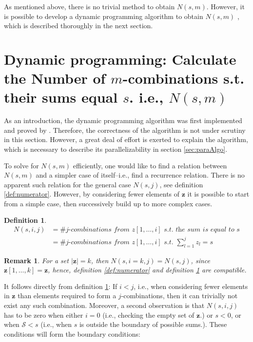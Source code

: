 \documentclass[a4paper,11pt]{article}
\newtheorem{mydef}{Definition}
\newtheorem{myremark}{Remark}
\begin{document}
As mentioned above, there is no trivial method to obtain $N(s,m)$. However, it is possible to develop a  dynamic programming algorithm to obtain $N(s,m)$ \cite{pagano_trichtler1983, zimmermann1985}, which is described thoroughly in the next section.

\section{Dynamic programming: Calculate the Number of $m$-combinations s.t. their sums equal $s$. i.e., $N(s,m)$}
\label{sec:calcBottleneck}

As an introduction, the dynamic programming algorithm was first implemented and proved by \cite{zimmermann1985, pagano_trichtler1983}. Therefore, the correctness of the algorithm is not under scrutiny in this section. However, a great deal of effort is exerted to explain the algorithm, which is necessary to describe its parallelizability in section \ref{sec:paraAlgo}.

To solve for $N(s,m)$ efficiently, one would like to find a relation between $N(s,m)$ and a simpler case of itself–i.e., find a recurrence relation. There is no apparent such relation for the general case $N(s,j)$, see definition \ref{def:numerator}. However, by considering fewer elements of $\bm{z}$ it is possible to start from a simple case, then successively build up to more complex cases.

\begin{mydef}
\label{def:specificNumerator}
\begin{align*}
N(s,i,j)&=\textit{\# j-combinations from $z[1,\ldots,i]$ s.t. the sum is equal to $s$}\\
        &=\textit{\# j-combinations from $z[1,\ldots,i]$ s.t. $\sum _{l=1}^{j}z_{l}=s$}
\end{align*}
\end{mydef}
\begin{myremark}
\label{rm:finalN}
For a set $|\bm{z}|=k$, then $N(s,i=k,j)=N(s,j)$, since $\bm{z}[1,\ldots,k]=\bm{z}$, hence, definition \ref{def:numerator} and definition \ref{def:specificNumerator} are compatible.
\end{myremark}

It follows directly from definition \ref{def:specificNumerator}: If $i<j$, i.e., when considering fewer elements in $\bm{z}$ than elements required to form a $j$-combinations, then it can trivially not exist any such combination. Moreover, a second observation is that $N(s,i,j)$ has to be zero when either $i=0$ (i.e., checking the empty set of $\bm{z}$.) or $s < 0$, or when $\mathcal{S} < s$ (i.e., when $s$ is outside the boundary of possible sums.). These conditions will form the boundary conditions:
\end{document}
